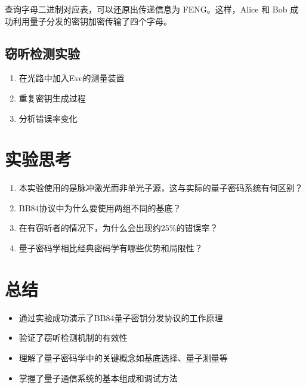 \documentclass{ctexart}
\begin{document}
查询字母二进制对应表，可以还原出传递信息为 FENG。这样，Alice 和 Bob 成功利用量子分发的密钥加密传输了四个字母。

\subsection{窃听检测实验}
\begin{enumerate}
\item 在光路中加入Eve的测量装置
\item 重复密钥生成过程
\item 分析错误率变化
\end{enumerate}

\section{实验思考}
\begin{enumerate}
\item 本实验使用的是脉冲激光而非单光子源，这与实际的量子密码系统有何区别？
\item BB84协议中为什么要使用两组不同的基底？
\item 在有窃听者的情况下，为什么会出现约25\%的错误率？
\item 量子密码学相比经典密码学有哪些优势和局限性？
\end{enumerate}

\section{总结}
\begin{itemize}
\item 通过实验成功演示了BB84量子密钥分发协议的工作原理
\item 验证了窃听检测机制的有效性
\item 理解了量子密码学中的关键概念如基底选择、量子测量等
\item 掌握了量子通信系统的基本组成和调试方法
\end{itemize}
\end{document}
